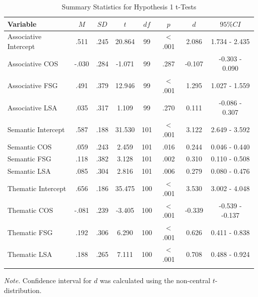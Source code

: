 \documentclass[english,man]{apa6}
\theoremstyle{definition}
\theoremstyle{definition}
\theoremstyle{definition}
\theoremstyle{remark}
\begin{document}
\begin{table}[tbp]
\begin{center}
\begin{threeparttable}
\caption{\label{tab:hyp1-table1}Summary Statistics for Hypothesis 1 t-Tests}
\begin{tabular}{lccccccc}
\toprule
Variable & $M$ & $SD$ & $t$ & $df$ & $p$ & $d$ & $95\% CI$\\
\midrule
Associative Intercept & .511 & .245 & 20.864 & 99 & < .001 & 2.086 & 1.734 - 2.435\\
Associative COS & -.030 & .284 & -1.071 & 99 & .287 & -0.107 & -0.303 - 0.090\\
Associative FSG & .491 & .379 & 12.946 & 99 & < .001 & 1.295 & 1.027 - 1.559\\
Associative LSA & .035 & .317 & 1.109 & 99 & .270 & 0.111 & -0.086 - 0.307\\
Semantic Intercept & .587 & .188 & 31.530 & 101 & < .001 & 3.122 & 2.649 - 3.592\\
Semantic COS & .059 & .243 & 2.459 & 101 & .016 & 0.244 & 0.046 - 0.440\\
Semantic FSG & .118 & .382 & 3.128 & 101 & .002 & 0.310 & 0.110 - 0.508\\
Semantic LSA & .085 & .304 & 2.816 & 101 & .006 & 0.279 & 0.080 - 0.476\\
Thematic Intercept & .656 & .186 & 35.475 & 100 & < .001 & 3.530 & 3.002 - 4.048\\
Thematic COS & -.081 & .239 & -3.405 & 100 & < .001 & -0.339 & -0.539 - -0.137\\
Thematic FSG & .192 & .306 & 6.290 & 100 & < .001 & 0.626 & 0.411 - 0.838\\
Thematic LSA & .188 & .265 & 7.111 & 100 & < .001 & 0.708 & 0.488 - 0.924\\
\bottomrule
\addlinespace
\end{tabular}
\begin{tablenotes}[para]
\textit{Note.} Confidence interval for $d$ was calculated using the non-central $t$-distribution. 
\end{tablenotes}
\end{threeparttable}
\end{center}
\end{table}
\end{document}
